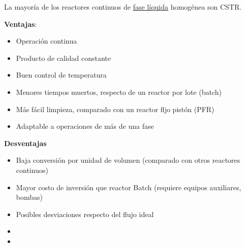     La mayoría de los reactores continuos de \underline{fase líquida} homogénea son CSTR.
    
    \begin{multicols}{2}
        \textbf{Ventajas}:
    
        \begin{itemize}
            \item Operación continua
            \item Producto de calidad constante
            \item Buen control de temperatura
            \item Menores tiempos muertos, respecto de un reactor por lote (batch)
            \item Más fácil limpieza, comparado con un reactor fljo pistón (PFR)
            \item Adaptable a operaciones de más de una fase
        \end{itemize}
        
        \textbf{Desventajas}
        
        \begin{itemize}
            \item Baja conversión por unidad de volumen (comparado con otros reactores continuos)
            \item Mayor costo de inversión que reactor Batch (requiere equipos auxiliares, bombas)
            \item Posibles desviaciones respecto del flujo ideal
            \item []
            \item []
        \end{itemize}
    \end{multicols}
    
